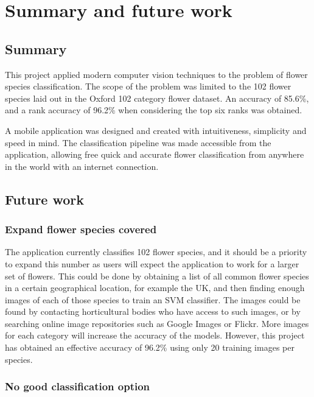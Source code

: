 \documentclass[11pt, a4paper]{report}
\begin{document}
\chapter{Summary and future work}


\section{Summary}

This project applied modern computer vision techniques to the problem of flower species classification. The scope of the problem was limited to the 102 flower species laid out in the Oxford 102 category flower dataset. An accuracy of 85.6\%, and a rank accuracy of 96.2\% when considering the top six ranks was obtained. 

A mobile application was designed and created with intuitiveness, simplicity and speed in mind. The classification pipeline was made accessible from the application, allowing free quick and accurate flower classification from anywhere in the world with an internet connection.

\section{Future work}

\subsection{Expand flower species covered}

The application currently classifies 102 flower species, and it should be a priority to expand this number as users will expect the application to work for a larger set of flowers. This could be done by obtaining a list of all common flower species in a certain geographical location, for example the UK, and then finding enough images of each of those species to train an SVM classifier. The images could be found by contacting horticultural bodies who have access to such images, or by searching online image repositories such as Google Images or Flickr. More images for each category will increase the accuracy of the models. However, this project has obtained an effective accuracy of 96.2\% using only 20 training images per species. 

\subsection{No good classification option}
\end{document}
